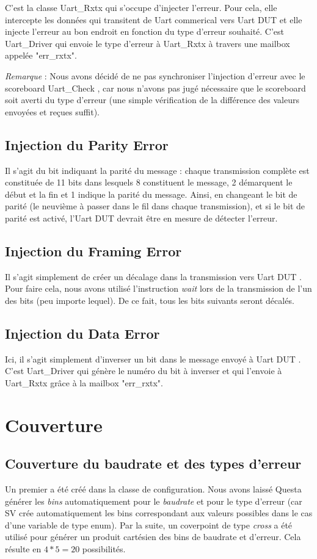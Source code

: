 \documentclass[12pt, titlepage]{article}
\newcommand{\udriver}{Uart\_Driver }
\newcommand{\ucheck}{Uart\_Check }
\newcommand{\urxtx}{Uart\_Rxtx }
\newcommand{\theDut}{Uart DUT }
\newcommand{\ucom}{Uart commerical }
\begin{document}
	C'est la classe \urxtx qui s'occupe d'injecter l'erreur. Pour cela, elle intercepte les données qui transitent de \ucom vers \theDut et elle injecte l'erreur au bon endroit en fonction du type d'erreur souhaité. C'est \udriver qui envoie le type d'erreur à \urxtx à travers une mailbox appelée "err\_rxtx".
    
    \emph{Remarque} : Nous avons décidé de ne pas synchroniser l'injection d'erreur avec le scoreboard \ucheck, car nous n'avons pas jugé nécessaire que le scoreboard soit averti du type d'erreur (une simple vérification de la différence des valeurs envoyées et reçues suffit).
    
    \subsection{Injection du Parity Error} 
    	Il s'agit du bit indiquant la parité du message : chaque transmission complète est constituée de 11 bits dans lesquels 8 constituent le message, 2 démarquent le début et la fin et 1 indique la parité du message. Ainsi, en changeant le bit de parité (le neuvième à passer dans le fil dans chaque transmission), et si le bit de parité est activé, l'\theDut devrait être en mesure de détecter l'erreur.
    	    	
    \subsection{Injection du Framing Error} 
    	Il s'agit simplement de créer un décalage dans la transmission vers \theDut. Pour faire cela, nous avons utilisé l'instruction \emph{wait} lors de la transmission de l'un des bits (peu importe lequel). De ce fait, tous les bits suivants seront décalés.

    \subsection{Injection du Data Error} 
    	Ici, il s'agit simplement d'inverser un bit dans le message envoyé à \theDut. C'est \udriver qui génère le numéro du bit à inverser et qui l'envoie à \urxtx grâce à la mailbox "err\_rxtx".


\section{Couverture}
    \subsection{Couverture du baudrate et des types d'erreur} 
    	Un premier \cvg a été créé dans la classe de configuration. Nous avons laissé Questa générer les \emph{bins} automatiquement pour le \emph{baudrate} et pour le type d'erreur (car SV crée automatiquement les bins correspondant aux valeurs possibles dans le cas d'une variable de type enum). Par la suite, un coverpoint de type \emph{cross} a été utilisé pour générer un produit cartésien des bins de baudrate et d'erreur. Cela résulte en $4 * 5 = 20$ possibilités. 
		
\end{document}
